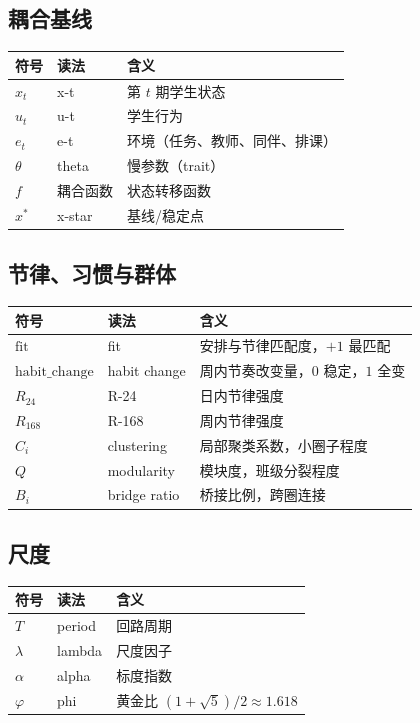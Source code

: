 \documentclass[UTF8,a4paper,11pt]{ctexart}
\begin{document}
\subsection{耦合基线}

\begin{longtable}{@{}p{2.8cm}p{4.4cm}p{7.0cm}@{}}
\toprule
\textbf{符号} & \textbf{读法} & \textbf{含义} \\
\midrule
$x_t$ & x-t & 第 $t$ 期学生状态 \\
$u_t$ & u-t & 学生行为 \\
$e_t$ & e-t & 环境（任务、教师、同伴、排课） \\
$\theta$ & theta & 慢参数（trait） \\
$f$ & 耦合函数 & 状态转移函数 \\
$x^*$ & x-star & 基线/稳定点 \\
\bottomrule
\end{longtable}

\subsection{节律、习惯与群体}

\begin{longtable}{@{}p{2.8cm}p{4.4cm}p{7.0cm}@{}}
\toprule
\textbf{符号} & \textbf{读法} & \textbf{含义} \\
\midrule
$\mathrm{fit}$ & fit & 安排与节律匹配度，$+1$ 最匹配 \\
$\mathrm{habit\_change}$ & habit change & 周内节奏改变量，$0$ 稳定，$1$ 全变 \\
$R_{24}$ & R-24 & 日内节律强度 \\
$R_{168}$ & R-168 & 周内节律强度 \\
$C_i$ & clustering & 局部聚类系数，小圈子程度 \\
$Q$ & modularity & 模块度，班级分裂程度 \\
$B_i$ & bridge ratio & 桥接比例，跨圈连接 \\
\bottomrule
\end{longtable}

\subsection{尺度}

\begin{longtable}{@{}p{2.8cm}p{4.4cm}p{7.0cm}@{}}
\toprule
\textbf{符号} & \textbf{读法} & \textbf{含义} \\
\midrule
$T$ & period & 回路周期 \\
$\lambda$ & lambda & 尺度因子 \\
$\alpha$ & alpha & 标度指数 \\
$\varphi$ & phi & 黄金比 $(1+\sqrt5)/2\approx1.618$ \\
\bottomrule
\end{longtable}
\end{document}
